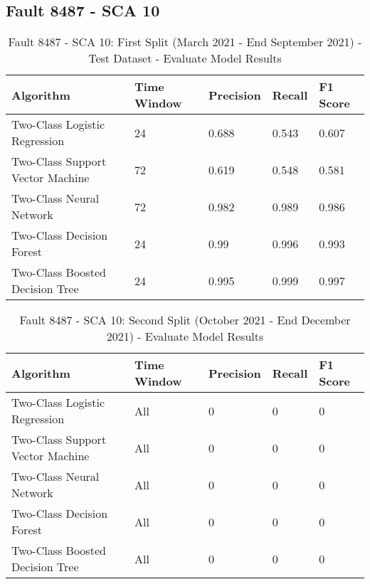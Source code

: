 \subsection{Fault 8487 - SCA 10}

\begin{table}[!ht]
    \centering
    \begin{tabular}{|l|l|l|l|l|}
    \hline
        Algorithm & Time Window & Precision & Recall & F1 Score \\ \hline
        Two-Class Logistic Regression & 24 & 0.688 & 0.543 & 0.607 \\ \hline
        Two-Class Support Vector Machine & 72 & 0.619 & 0.548 & 0.581 \\ \hline
        Two-Class Neural Network & 72 & 0.982 & 0.989 & 0.986 \\ \hline
        Two-Class Decision Forest & 24 & 0.99 & 0.996 & 0.993 \\ \hline
        Two-Class Boosted Decision Tree & 24 & 0.995 & 0.999 & 0.997 \\ \hline
    \end{tabular}
    \caption{Fault 8487 - SCA 10: First Split (March 2021 - End September 2021) - Test Dataset - Evaluate Model Results}
    \label{9112_SCA34_1st}
\end{table}

\begin{table}[!ht]
    \centering
    \begin{tabular}{|l|l|l|l|l|}
    \hline
        Algorithm & Time Window & Precision & Recall & F1 Score \\ \hline
        Two-Class Logistic Regression & All & 0 & 0 & 0 \\ \hline
        Two-Class Support Vector Machine & All & 0 & 0 & 0 \\ \hline
        Two-Class Neural Network & All & 0 & 0 & 0 \\ \hline
        Two-Class Decision Forest & All & 0 & 0 & 0 \\ \hline
        Two-Class Boosted Decision Tree & All & 0 & 0 & 0 \\ \hline
    \end{tabular}
    \caption{Fault 8487 - SCA 10: Second Split (October 2021 - End December 2021) - Evaluate Model Results}
    \label{9112_SCA34_1st}
\end{table}

